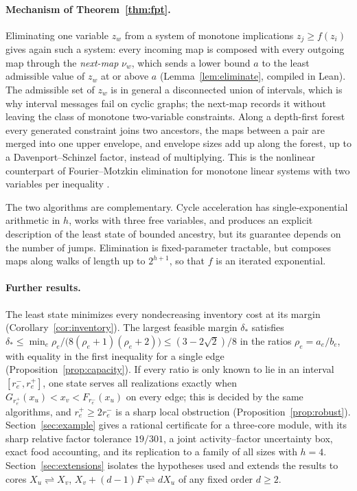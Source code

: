 \documentclass[11pt,a4paper]{article}
\theoremstyle{plain}
\theoremstyle{definition}
\theoremstyle{remark}
\newcommand{\rev}{\rightleftharpoons}
\begin{document}
\paragraph{Mechanism of Theorem~\ref{thm:fpt}.} Eliminating one variable $z_w$ from a system of monotone implications $z_j\ge f(z_i)$ gives again such a system: every incoming map is composed with every outgoing map through the \emph{next-map} $\nu_w$, which sends a lower bound $a$ to the least admissible value of $z_w$ at or above $a$ (Lemma~\ref{lem:eliminate}, compiled in Lean). The admissible set of $z_w$ is in general a disconnected union of intervals, which is why interval messages fail on cyclic graphs; the next-map records it without leaving the class of monotone two-variable constraints. Along a depth-first forest every generated constraint joins two ancestors, the maps between a pair are merged into one upper envelope, and envelope sizes add up along the forest, up to a Davenport--Schinzel factor, instead of multiplying. This is the nonlinear counterpart of Fourier--Motzkin elimination for monotone linear systems with two variables per inequality \citep{hochbaum1994}.

The two algorithms are complementary. Cycle acceleration has single-exponential arithmetic in $h$, works with three free variables, and produces an explicit description of the least state of bounded ancestry, but its guarantee depends on the number of jumps. Elimination is fixed-parameter tractable, but composes maps along walks of length up to $2^{h+1}$, so that $f$ is an iterated exponential.

\paragraph{Further results.} The least state minimizes every nondecreasing inventory cost at its margin (Corollary~\ref{cor:inventory}). The largest feasible margin $\delta_*$ satisfies $\delta_*\le\min_e\rho_e/\bigl(8(\rho_e+1)(\rho_e+2)\bigr)\le(3-2\sqrt2)/8$ in the ratios $\rho_e=a_e/b_e$, with equality in the first inequality for a single edge (Proposition~\ref{prop:capacity}). If every ratio is only known to lie in an interval $[r_e^-,r_e^+]$, one state serves all realizations exactly when $G_{r_e^+}(x_u)<x_v<F_{r_e^-}(x_u)$ on every edge; this is decided by the same algorithms, and $r_e^+\ge2r_e^-$ is a sharp local obstruction (Proposition~\ref{prop:robust}). Section~\ref{sec:example} gives a rational certificate for a three-core module, with its sharp relative factor tolerance $19/301$, a joint activity--factor uncertainty box, exact food accounting, and its replication to a family of all sizes with $h=4$. Section~\ref{sec:extensions} isolates the hypotheses used and extends the results to cores $X_u\rev X_v$, $X_v+(d-1)F\rev dX_u$ of any fixed order $d\ge2$.
\end{document}
